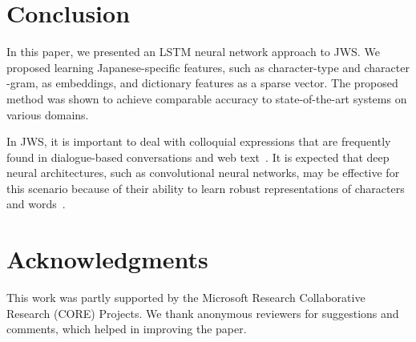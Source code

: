 \documentclass[11pt]{article}
\begin{document}
\section{Conclusion}
In this paper, we presented an LSTM neural network approach to JWS.
We proposed learning Japanese-specific features, such as character-type and character
-gram, as embeddings, and dictionary features as a sparse vector.
The proposed method was shown to achieve comparable accuracy to 
state-of-the-art systems on various domains. 


In JWS, it is important to deal with colloquial expressions that are
frequently found in dialogue-based conversations and web
text~\cite{saito-EtAl:2014:Coling,sasano-kurohashi-okumura:2013:IJCNLP,kaji-kitsuregawa:2014:EMNLP2014}.
It is expected that deep neural architectures, such as convolutional neural
networks, may be effective for this scenario because of their ability to learn
robust representations of characters and words~\cite{ling-EtAl:2015:EMNLP2}.

\section*{Acknowledgments}
This work was partly supported by the Microsoft Research Collaborative Research
(CORE) Projects. We thank anonymous reviewers for suggestions and comments,
which helped in improving the paper.



\end{document}
